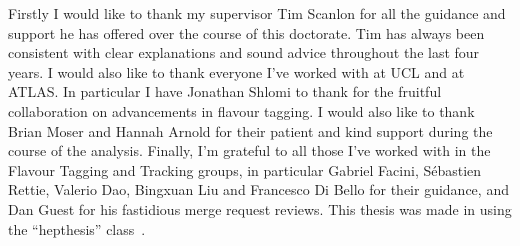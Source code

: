 Firstly I would like to thank my supervisor Tim Scanlon for all the guidance and support he has offered over the course of this doctorate.
Tim has always been consistent with clear explanations and sound advice throughout the last four years.
I would also like to thank everyone I've worked with at UCL and at ATLAS.
In particular I have Jonathan Shlomi to thank for the fruitful collaboration on advancements in flavour tagging.
I would also like to thank Brian Moser and Hannah Arnold for their patient and kind support during the course of the \VHbb analysis.
Finally, I'm grateful to all those I've worked with in the Flavour Tagging and Tracking groups, in particular Gabriel Facini, S\'ebastien Rettie, Valerio Dao, Bingxuan Liu and Francesco Di Bello for their guidance, and Dan Guest for his fastidious merge request reviews.
This thesis was made in \LaTeXe{} using the ``hepthesis'' class~\cite{Buckley:2010:hepthesis}.
